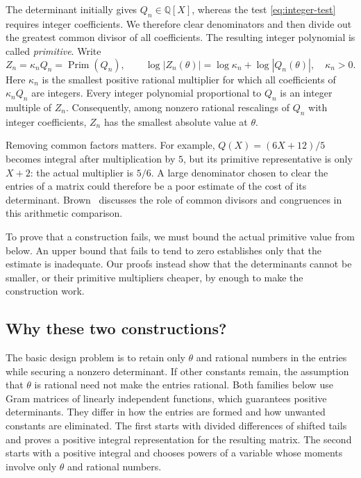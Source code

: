 \documentclass[11pt]{article}
\theoremstyle{definition}
\theoremstyle{remark}
\numberwithin{equation}{section}
\newcommand{\Q}{\mathbb Q}
\newcommand{\PP}{\operatorname{Prim}}
\begin{document}
The determinant initially gives $Q_n\in\Q[X]$, whereas the test
\eqref{eq:integer-test} requires integer coefficients. We therefore
clear denominators and then divide out the greatest common divisor of
all coefficients. The resulting integer polynomial is called
\emph{primitive}. Write
\begin{equation}\label{eq:budget}
 Z_n=\kappa_n Q_n=\PP(Q_n),\qquad
 \log|Z_n(\theta)|=\log\kappa_n+\log|Q_n(\theta)|,
 \quad \kappa_n>0.
\end{equation}
Here $\kappa_n$ is the smallest positive rational multiplier for which
all coefficients of $\kappa_n Q_n$ are integers.
Every integer polynomial proportional to $Q_n$ is an integer multiple
of $Z_n$. Consequently, among nonzero rational rescalings of $Q_n$
with integer coefficients, $Z_n$ has the smallest absolute value at
$\theta$.

Removing common factors matters. For example,
$Q(X)=(6X+12)/5$ becomes integral after multiplication by $5$, but its
primitive representative is only $X+2$: the actual multiplier is $5/6$.
A large denominator chosen to clear the entries of a matrix could
therefore be a poor estimate of the cost of its determinant.
Brown~\cite[Section~7.4]{Brown} discusses the role of common divisors
and congruences in this arithmetic comparison.

To prove that a construction fails, we must bound the actual primitive
value from below. An upper bound that fails to tend to zero establishes
only that the estimate is inadequate. Our proofs instead show that
the determinants cannot be smaller, or their primitive multipliers
cheaper, by enough to make the construction work.

\subsection{Why these two constructions?}

The basic design problem is to retain only $\theta$ and rational numbers
in the entries while securing a nonzero determinant. If other constants
remain, the assumption that $\theta$ is rational need not make the
entries rational. Both families below use Gram matrices of linearly
independent functions, which guarantees positive determinants.
They differ in how the entries are formed and how
unwanted constants are eliminated. The first starts with divided
differences of shifted tails and proves a positive integral
representation for the resulting matrix. The second starts with a
positive integral and chooses powers of a variable whose moments
involve only $\theta$ and rational numbers.
\end{document}
